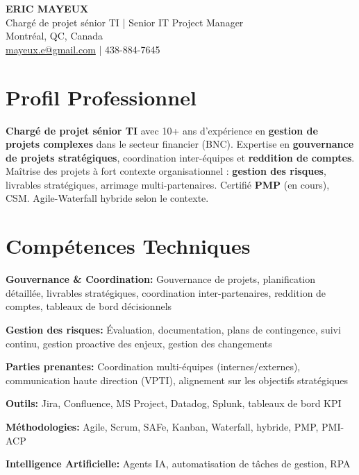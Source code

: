 \documentclass[11pt,a4paper]{article}
\begin{document}
\begin{center}
    {\LARGE \textbf{ERIC MAYEUX}}\\
    \vspace{4pt}
    {\large Chargé de projet sénior TI | Senior IT Project Manager}\\
    \vspace{4pt}
    Montréal, QC, Canada\\
    \href{mailto:mayeux.e@gmail.com}{mayeux.e@gmail.com} | 438-884-7645
\end{center}

\vspace{8pt}

\section*{Profil Professionnel}
\noindent
\textbf{Chargé de projet sénior TI} avec 10+ ans d'expérience en \textbf{gestion de projets complexes} dans le secteur financier (BNC). Expertise en \textbf{gouvernance de projets stratégiques}, coordination inter-équipes et \textbf{reddition de comptes}. Maîtrise des projets à fort contexte organisationnel : \textbf{gestion des risques}, livrables stratégiques, arrimage multi-partenaires. Certifié \textbf{PMP} (en cours), CSM. Agile-Waterfall hybride selon le contexte.

\section*{Compétences Techniques}

\textbf{Gouvernance \& Coordination:} Gouvernance de projets, planification détaillée, livrables stratégiques, coordination inter-partenaires, reddition de comptes, tableaux de bord décisionnels

\textbf{Gestion des risques:} Évaluation, documentation, plans de contingence, suivi continu, gestion proactive des enjeux, gestion des changements

\textbf{Parties prenantes:} Coordination multi-équipes (internes/externes), communication haute direction (VPTI), alignement sur les objectifs stratégiques

\textbf{Outils:} Jira, Confluence, MS Project, Datadog, Splunk, tableaux de bord KPI

\textbf{Méthodologies:} Agile, Scrum, SAFe, Kanban, Waterfall, hybride, PMP, PMI-ACP

\textbf{Intelligence Artificielle:} Agents IA, automatisation de tâches de gestion, RPA
\end{document}
